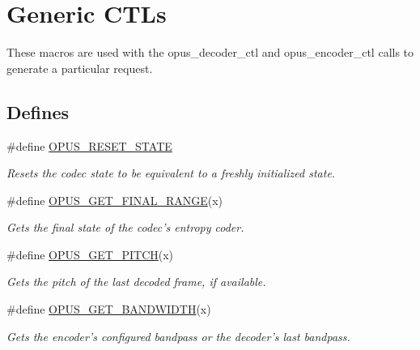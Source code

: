 \hypertarget{group__opus__genericctls}{
\section{Generic CTLs}
\label{group__opus__genericctls}
}


These macros are used with the {\ttfamily opus\_\-decoder\_\-ctl} and {\ttfamily opus\_\-encoder\_\-ctl} calls to generate a particular request.  
\subsection*{Defines}
\begin{DoxyCompactItemize}
\item 
\#define \hyperlink{group__opus__genericctls_gadc74e4fa8bcdf9994187d52d92207337}{OPUS\_\-RESET\_\-STATE}
\begin{DoxyCompactList}\small\item\em Resets the codec state to be equivalent to a freshly initialized state. \item\end{DoxyCompactList}\item 
\#define \hyperlink{group__opus__genericctls_ga1108a508aa475f964d247c1b04d26d89}{OPUS\_\-GET\_\-FINAL\_\-RANGE}(x)
\begin{DoxyCompactList}\small\item\em Gets the final state of the codec's entropy coder. \item\end{DoxyCompactList}\item 
\#define \hyperlink{group__opus__genericctls_gaa89fc25eb35fc31a02b508562dd83820}{OPUS\_\-GET\_\-PITCH}(x)
\begin{DoxyCompactList}\small\item\em Gets the pitch of the last decoded frame, if available. \item\end{DoxyCompactList}\item 
\#define \hyperlink{group__opus__genericctls_ga29db1d9b5e670debec54d1163ad2ec62}{OPUS\_\-GET\_\-BANDWIDTH}(x)
\begin{DoxyCompactList}\small\item\em Gets the encoder's configured bandpass or the decoder's last bandpass. \item\end{DoxyCompactList}\end{DoxyCompactItemize}


